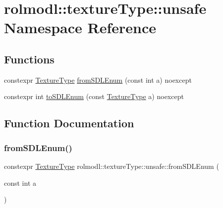\hypertarget{namespacerolmodl_1_1texture_type_1_1unsafe}{}\section{rolmodl\+::texture\+Type\+::unsafe Namespace Reference}
\label{namespacerolmodl_1_1texture_type_1_1unsafe}
\subsection*{Functions}
\begin{DoxyCompactItemize}
\item 
constexpr \mbox{\hyperlink{namespacerolmodl_a7090840be12da261b3a8af5852e9f4fd}{Texture\+Type}} \mbox{\hyperlink{namespacerolmodl_1_1texture_type_1_1unsafe_acd1de5e9708cf40e2bcd45a1f066126e}{from\+S\+D\+L\+Enum}} (const int a) noexcept
\item 
constexpr int \mbox{\hyperlink{namespacerolmodl_1_1texture_type_1_1unsafe_acc2a0635f2d6d20bc161a1d54f06ee51}{to\+S\+D\+L\+Enum}} (const \mbox{\hyperlink{namespacerolmodl_a7090840be12da261b3a8af5852e9f4fd}{Texture\+Type}} a) noexcept
\end{DoxyCompactItemize}


\subsection{Function Documentation}
\mbox{\label{namespacerolmodl_1_1texture_type_1_1unsafe_acd1de5e9708cf40e2bcd45a1f066126e}} 
\subsubsection{\texorpdfstring{fromSDLEnum()}{fromSDLEnum()}}
{\footnotesize\ttfamily constexpr \mbox{\hyperlink{namespacerolmodl_a7090840be12da261b3a8af5852e9f4fd}{Texture\+Type}} rolmodl\+::texture\+Type\+::unsafe\+::from\+S\+D\+L\+Enum (\begin{DoxyParamCaption}\item[{const int}]{a }\end{DoxyParamCaption})\hspace{0.3cm}{\ttfamily [noexcept]}}



